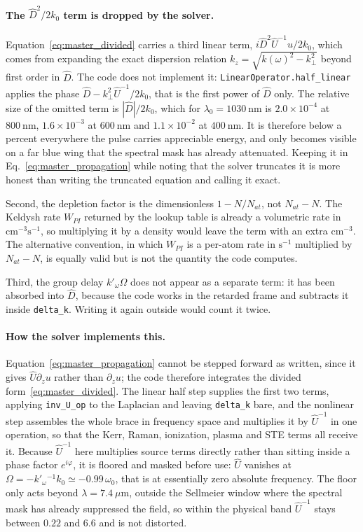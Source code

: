 \paragraph{The $\hat{D}^2/2k_0$ term is dropped by the solver.} Equation~\eqref{eq:master_divided} carries a third linear term, $i\hat{D}^2\hat{U}^{-1}u/2k_0$, which comes from expanding the exact dispersion relation $k_z=\sqrt{k(\omega)^2-k_\perp^2}$ beyond first order in $\hat{D}$. The code does not implement it: \texttt{LinearOperator.half\_linear} applies the phase $\hat{D}-k_\perp^2\hat{U}^{-1}/2k_0$, that is the first power of $\hat{D}$ only. The relative size of the omitted term is $|\hat{D}|/2k_0$, which for $\lambda_0=1030\ \text{nm}$ is $2.0\times10^{-4}$ at $800\ \text{nm}$, $1.6\times10^{-3}$ at $600\ \text{nm}$ and $1.1\times10^{-2}$ at $400\ \text{nm}$. It is therefore below a percent everywhere the pulse carries appreciable energy, and only becomes visible on a far blue wing that the spectral mask has already attenuated. Keeping it in Eq.~\eqref{eq:master_propagation} while noting that the solver truncates it is more honest than writing the truncated equation and calling it exact.

Second, the depletion factor is the dimensionless $1-N/N_{at}$, not $N_{at}-N$. The Keldysh rate $W_{PI}$ returned by the lookup table is already a volumetric rate in $\text{cm}^{-3}\text{s}^{-1}$, so multiplying it by a density would leave the term with an extra $\text{cm}^{-3}$. The alternative convention, in which $W_{PI}$ is a per-atom rate in $\text{s}^{-1}$ multiplied by $N_{at}-N$, is equally valid but is not the quantity the code computes.

Third, the group delay $k'_\omega\Omega$ does not appear as a separate term: it has been absorbed into $\hat{D}$, because the code works in the retarded frame and subtracts it inside \texttt{delta\_k}. Writing it again outside would count it twice.

\paragraph{How the solver implements this.} Equation~\eqref{eq:master_propagation} cannot be stepped forward as written, since it gives $\hat{U}\partial_z u$ rather than $\partial_z u$; the code therefore integrates the divided form~\eqref{eq:master_divided}. The linear half step supplies the first two terms, applying \texttt{inv\_U\_op} to the Laplacian and leaving \texttt{delta\_k} bare, and the nonlinear step assembles the whole brace in frequency space and multiplies it by $\hat{U}^{-1}$ in one operation, so that the Kerr, Raman, ionization, plasma and STE terms all receive it. Because $\hat{U}^{-1}$ here multiplies source terms directly rather than sitting inside a phase factor $e^{i\varphi}$, it is floored and masked before use: $\hat{U}$ vanishes at $\Omega=-k'_\omega{}^{-1}k_0\simeq-0.99\,\omega_0$, that is at essentially zero absolute frequency. The floor only acts beyond $\lambda=7.4\ \mu\text{m}$, outside the Sellmeier window where the spectral mask has already suppressed the field, so within the physical band $\hat{U}^{-1}$ stays between $0.22$ and $6.6$ and is not distorted.

